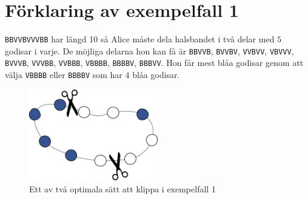 \section*{Förklaring av exempelfall 1}
\texttt{BBVVBVVVBB} har längd 10 så Alice måste dela halsbandet i två delar med $5$ godisar i varje.
De möjliga delarna hon kan få är \texttt{BBVVB}, \texttt{BVVBV}, \texttt{VVBVV}, \texttt{VBVVV},
\texttt{BVVVB}, \texttt{VVVBB}, \texttt{VVBBB}, \texttt{VBBBB}, \texttt{BBBBV}, \texttt{BBBVV}.
Hon får mest blåa godisar genom att välja \texttt{VBBBB} eller \texttt{BBBBV} som har $4$ blåa godisar.



\begin{figure}[h]
	\centering
\includegraphics[width=0.5\textwidth]{sample1}
\caption{Ett av två optimala sätt att klippa i exempelfall 1}
\end{figure}
